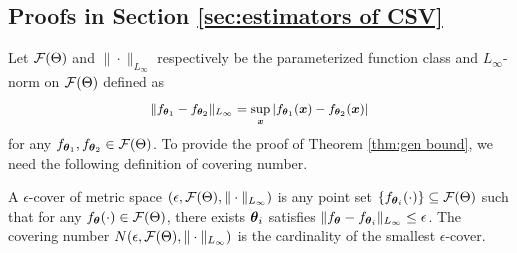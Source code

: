 \subsection{Proofs in Section \ref{sec:estimators of CSV}}\label{app: proofs in sec:estimators of CSV}
Let $\mathcal{F}(\Theta)$ and $\|\cdot\|_{L_{\infty}}$ respectively be the parameterized function class and $L_{\infty}$-norm on $\mathcal{F}(\Theta)$ defined as 
\begin{equation}
	\small
	\|f_{\btheta_{1}} - f_{\btheta_{2}}\|_{L_{\infty}} = \sup_{\bx}|f_{\btheta_{1}}(\bx) - f_{\btheta_{2}}(\bx)| 
\end{equation}
for any $f_{\text{\boldmath{$\theta$}}_{1}}, f_{\text{\boldmath{$\theta$}}_{2}}\in\mathcal{F}(\Theta)$. To provide the proof of Theorem \ref{thm:gen bound}, we need the following definition of covering number.
\begin{definition}
	A $\epsilon$-cover of metric space $(\epsilon, \mathcal{F}(\Theta), \|\cdot\|_{L_{\infty}})$ is any point set $\{f_{\text{\boldmath{$\theta$}}_{i}}(\cdot)\}\subseteq\mathcal{F}(\Theta)$ such that for any $f_{\text{\boldmath{$\theta$}}}(\cdot)\in \mathcal{F}(\Theta)$, there exists $\text{\boldmath{$\theta$}}_{i}$ satisfies $\|f_{\text{\boldmath{$\theta$}}} - f_{\text{\boldmath{$\theta$}}_{i}}\|_{L_{\infty}}\leq \epsilon$. The covering number $N(\epsilon, \mathcal{F}(\Theta), \|\cdot\|_{L_{\infty}})$ is the cardinality of the smallest $\epsilon$-cover.  
\end{definition}
\genbound*
